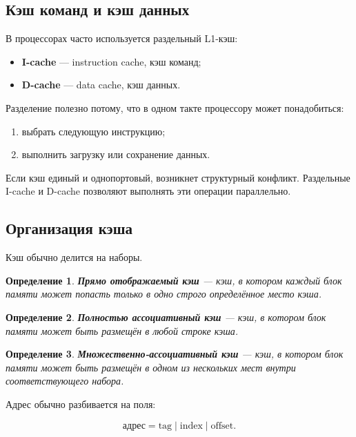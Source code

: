 \documentclass[12pt,a4paper]{article}
\newtheorem{definition}{Определение}
\begin{document}
\subsection{Кэш команд и кэш данных}

В процессорах часто используется раздельный L1-кэш:

\begin{itemize}
    \item \textbf{I-cache} --- instruction cache, кэш команд;
    \item \textbf{D-cache} --- data cache, кэш данных.
\end{itemize}

Разделение полезно потому, что в одном такте процессору может понадобиться:

\begin{enumerate}
    \item выбрать следующую инструкцию;
    \item выполнить загрузку или сохранение данных.
\end{enumerate}

Если кэш единый и однопортовый, возникнет структурный конфликт. Раздельные I-cache и D-cache позволяют выполнять эти операции параллельно.

\subsection{Организация кэша}

Кэш обычно делится на наборы.

\begin{definition}
\textbf{Прямо отображаемый кэш} --- кэш, в котором каждый блок памяти может попасть только в одно строго определённое место кэша.
\end{definition}

\begin{definition}
\textbf{Полностью ассоциативный кэш} --- кэш, в котором блок памяти может быть размещён в любой строке кэша.
\end{definition}

\begin{definition}
\textbf{Множественно-ассоциативный кэш} --- кэш, в котором блок памяти может быть размещён в одном из нескольких мест внутри соответствующего набора.
\end{definition}

Адрес обычно разбивается на поля:

\[
    \text{адрес} =
    \text{tag} \mid \text{index} \mid \text{offset}.
\]
\end{document}
